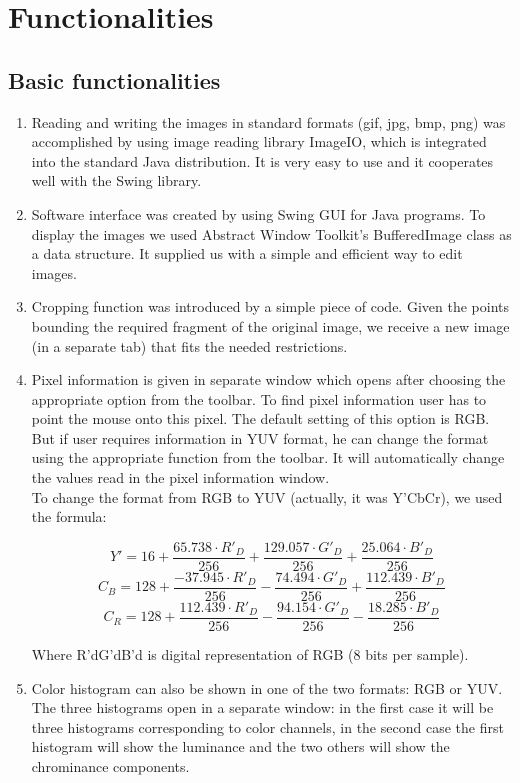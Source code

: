 \documentclass[a4paper,12pt]{article}
\begin{document}
\section{Functionalities}

\subsection{Basic functionalities}

\begin{enumerate}
    \item Reading and writing the images in standard formats (gif, jpg, bmp, png) was accomplished by using image reading library ImageIO, which is integrated into the standard Java distribution. It is very easy to use and it cooperates well with the Swing library. 

    \item Software interface was created by using Swing GUI for Java programs. To display the images we used Abstract Window Toolkit's BufferedImage class as a data structure. It supplied us with a simple and efficient way to edit images.

	 \item Cropping function was introduced by a simple piece of code. Given the points bounding the required fragment of the original image, we receive a new image (in a separate tab) that fits the needed restrictions.

	 \item Pixel information is given in separate window which opens after choosing the appropriate option from the toolbar. To find pixel information user has to point the mouse onto this pixel. The default setting of this option is RGB. But if user requires information in YUV format, he can change the format using the appropriate function from the toolbar. It will automatically change the values read in the pixel information window.\\
To change the format from RGB to YUV (actually, it was Y'CbCr), we used the formula:

$$Y'=16+\frac{65.738\cdot R'_D}{256}+\frac{129.057\cdot G'_D}{256}+\frac{25.064\cdot B'_D}{256}$$
$$C_B=128+\frac{-37.945\cdot R'_D}{256}-\frac{74.494\cdot G'_D}{256}+\frac{112.439\cdot B'_D}{256}$$
$$C_R=128+\frac{112.439\cdot R'_D}{256}-\frac{94.154\cdot G'_D}{256}-\frac{18.285\cdot B'_D}{256}$$

Where R'dG'dB'd is digital representation of RGB (8 bits per sample).

	 \item Color histogram can also be shown in one of the two formats: RGB or YUV. The three histograms open in a separate window: in the first case it will be three histograms corresponding to color channels, in the second case the first histogram will show the luminance and the two others will show the chrominance components.


\end{enumerate}
\end{document}
